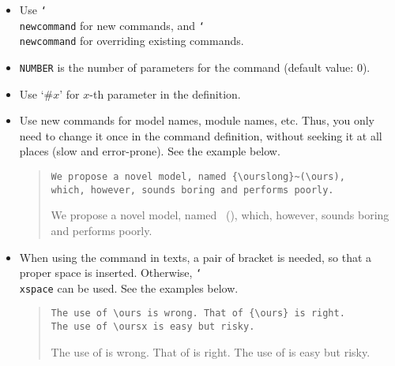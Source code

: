 \begin{itemize}
\begin{itemize}
    \begin{itemize}
      \item Use \texttt{\char`\\newcommand} for new commands, and \texttt{\char`\\newcommand} for overriding existing commands.
      \item \texttt{NUMBER} is the number of parameters for the command (default value: 0).
      \item Use `\#$x$' for $x$-th parameter in the definition.

      \item
        Use new commands for model names, module names, etc.
        Thus, you only need to change it once in the command definition, without seeking it at all places (slow and error-prone).
        See the example below.
      \begin{quote}\begin{scriptsize}
        \begin{verbatim}
We propose a novel model, named {\ourslong}~(\ours),
which, however, sounds boring and performs poorly.
        \end{verbatim}

        We propose a novel model, named {\ourslong}~(\ours), which, however, sounds boring and performs poorly.
      \end{scriptsize}\end{quote}

      \item 
        When using the command in texts, a pair of bracket is needed, so that a proper space is inserted. 
        Otherwise, \texttt{\char`\\xspace} can be used.
        See the examples below.

      \begin{quote}\begin{scriptsize}
        \begin{verbatim}
The use of \ours is wrong. That of {\ours} is right.
The use of \oursx is easy but risky.
        \end{verbatim}
        The use of \ours is wrong. That of {\ours} is right.
        The use of \oursx is easy but risky.
      \end{scriptsize}\end{quote}

      \end{itemize}
    \end{itemize}


\end{itemize}
